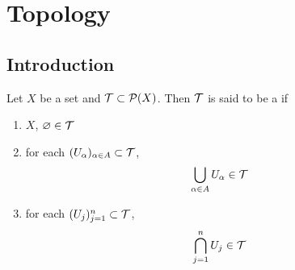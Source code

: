 \documentclass{book}
\begin{document}
	
	
	
	
	
	
	
	
	
	
	
	
	
	
	
	
	
	
	
	
	
	
	
	
	
	
	
	
	
	
	
	
	
	
	
	
	
	
	
	
	
	
	
	
	
	
	
	
	
	
	
	
	
	
	
	
	
	
	
	
	
	
	
	
	
	
	
	
	\newpage
	\chapter{Topology}
	
	\section{Introduction}
	
	\begin{defn} 
	Let $X$ be a set and $\mathcal{T} \subset \mathcal{P}(X)$. Then $\mathcal{T}$ is said to be a  if 
	\begin{enumerate}
	\item $X$, $\varnothing \in \mathcal{T}$ 
	\item for each $(U_{\alpha})_{\alpha \in A} \subset \mathcal{T}$, $$\bigcup_{\alpha \in A}U_{\alpha} \in \mathcal{T}$$
	\item for each $(U_j)_{j=1}^n \subset \mathcal{T}$, $$\bigcap_{j=1}^n U_{j} \in \mathcal{T}$$
	\end{enumerate}
	\end{defn}		
	
\end{document}
